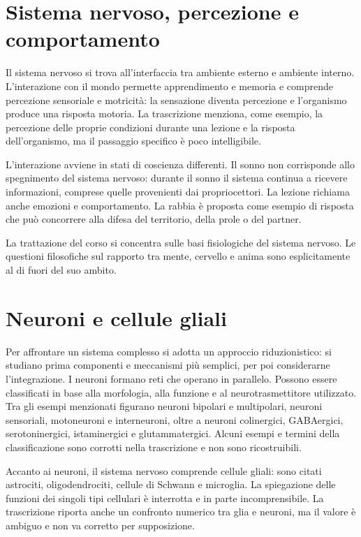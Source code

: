 \section{Sistema nervoso, percezione e comportamento}

Il sistema nervoso si trova all'interfaccia tra ambiente esterno e ambiente interno. L'interazione con il mondo permette apprendimento e memoria e comprende percezione sensoriale e motricità: la sensazione diventa percezione e l'organismo produce una risposta motoria. La trascrizione menziona, come esempio, la percezione delle proprie condizioni durante una lezione e la risposta dell'organismo, ma il passaggio specifico è poco intelligibile.

L'interazione avviene in stati di coscienza differenti. Il sonno non corrisponde allo spegnimento del sistema nervoso: durante il sonno il sistema continua a ricevere informazioni, comprese quelle provenienti dai propriocettori. La lezione richiama anche emozioni e comportamento. La rabbia è proposta come esempio di risposta che può concorrere alla difesa del territorio, della prole o del partner.

La trattazione del corso si concentra sulle basi fisiologiche del sistema nervoso. Le questioni filosofiche sul rapporto tra mente, cervello e anima sono esplicitamente al di fuori del suo ambito.

\section{Neuroni e cellule gliali}

Per affrontare un sistema complesso si adotta un approccio riduzionistico: si studiano prima componenti e meccanismi più semplici, per poi considerarne l'integrazione. I neuroni formano reti che operano in parallelo. Possono essere classificati in base alla morfologia, alla funzione e al neurotrasmettitore utilizzato. Tra gli esempi menzionati figurano neuroni bipolari e multipolari, neuroni sensoriali, motoneuroni e interneuroni, oltre a neuroni colinergici, GABAergici, serotoninergici, istaminergici e glutammatergici. Alcuni esempi e termini della classificazione sono corrotti nella trascrizione e non sono ricostruibili.

Accanto ai neuroni, il sistema nervoso comprende cellule gliali: sono citati astrociti, oligodendrociti, cellule di Schwann e microglia. La spiegazione delle funzioni dei singoli tipi cellulari è interrotta e in parte incomprensibile. La trascrizione riporta anche un confronto numerico tra glia e neuroni, ma il valore è ambiguo e non va corretto per supposizione.

